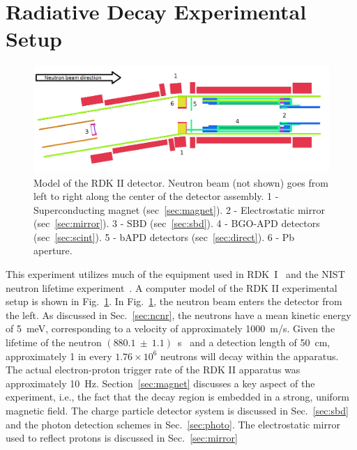 \documentclass[oneside,12pt]{memoir}
\begin{document}
\section{Radiative Decay Experimental Setup}
\label{sec:setup}
\begin{figure}[t]
	\includegraphics[width=\textwidth]{detector_model.png}
	\caption[Model of the RDK II detector]{Model of the RDK II detector. Neutron beam (not shown) goes from left to right along the center of the detector assembly. 1 - Superconducting magnet (sec~\ref{sec:magnet}). 2 - Electrostatic mirror (sec~\ref{sec:mirror}). 3 - SBD (sec~\ref{sec:sbd}). 4 - BGO-APD detectors (sec~\ref{sec:scint}). 5 - bAPD detectors (sec~\ref{sec:direct}). 6 - Pb aperture.}
	\label{fig:model}
\end{figure}
This experiment utilizes much of the equipment used in RDK~I~\cite{rdk1prc} and the NIST neutron lifetime experiment~\cite{nlt}. A computer model of the RDK II experimental setup is shown in Fig.~\ref{fig:model}. In Fig.~\ref{fig:model}, the neutron beam enters the detector from the left. As discussed in Sec.~\ref{sec:ncnr}, the neutrons have a mean kinetic energy of 5~meV, corresponding to a velocity of approximately 1000~m/s. Given the lifetime of the neutron $(880.1~\pm~1.1)$~s~\cite{pdg} and a detection length of 50~cm, approximately 1 in every $1.76\times 10^{6}$ neutrons will decay within the apparatus. 
The actual electron-proton trigger rate of the RDK II apparatus was approximately 10~Hz. Section~\ref{sec:magnet} discusses a key aspect of the experiment, i.e., the fact that the decay region is embedded in a strong, uniform magnetic field. The charge particle detector system is discussed in Sec.~\ref{sec:sbd} and the photon detection schemes in Sec.~\ref{sec:photo}. The electrostatic mirror used to reflect protons is discussed in Sec.~\ref{sec:mirror}\par
\end{document}
